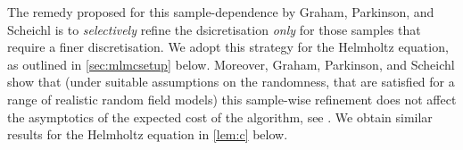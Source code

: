 The remedy proposed for this sample-dependence by Graham, Parkinson, and Scheichl is to \emph{selectively} refine the dsicretisation \emph{only} for those samples that require a finer discretisation. We adopt this strategy for the Helmholtz equation, as outlined in \cref{sec:mlmcsetup} below. Moreover, Graham, Parkinson, and Scheichl show that (under suitable assumptions on the randomness, that are satisfied for a range of realistic random field models) this sample-wise refinement does not affect the asymptotics of the expected cost of the algorithm, see \cite[Lemma 5.8]{GrPaSc:19}. We obtain similar results for the Helmholtz equation in \cref{lem:c} below.


